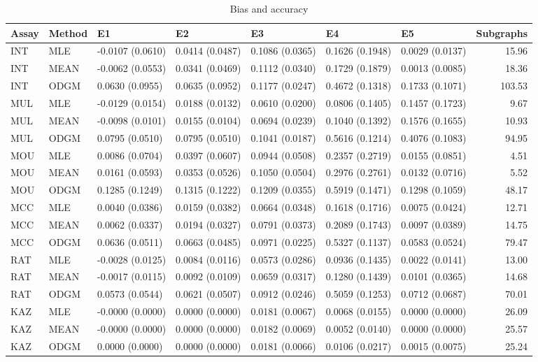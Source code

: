 \begin{table*}[t]
\begin{center}
  \begin{tabular}{lllllllr}
  \hline
 Assay & Method & E1 & E2 & E3 & E4 & E5 & Subgraphs \\ 
  \hline
  INT & MLE & -0.0107 (0.0610) & 0.0414 (0.0487) & 0.1086 (0.0365) & 0.1626 (0.1948) & 0.0029 (0.0137) & 15.96 \\ 
  INT & MEAN & -0.0062 (0.0553) & 0.0341 (0.0469) & 0.1112 (0.0340) & 0.1729 (0.1879) & 0.0013 (0.0085)& 18.36 \\ 
  INT & ODGM & 0.0630 (0.0955) & 0.0635 (0.0952) & 0.1177 (0.0247) & 0.4672 (0.1318) & 0.1733 (0.1071) & 103.53 \\ 
  MUL & MLE & -0.0129 (0.0154) & 0.0188 (0.0132) & 0.0610 (0.0200) & 0.0806 (0.1405) & 0.1457 (0.1723) & 9.67 \\ 
  MUL & MEAN & -0.0098 (0.0101) & 0.0155 (0.0104) & 0.0694 (0.0239) & 0.1040 (0.1392) & 0.1576 (0.1655)& 10.93 \\ 
  MUL & ODGM & 0.0795 (0.0510) & 0.0795 (0.0510) & 0.1041 (0.0187) & 0.5616 (0.1214) & 0.4076 (0.1083) & 94.95 \\ 
  MOU & MLE & 0.0086 (0.0704) & 0.0397 (0.0607) & 0.0944 (0.0508)  & 0.2357 (0.2719) & 0.0155 (0.0851) & 4.51 \\ 
  MOU & MEAN & 0.0161 (0.0593) & 0.0353 (0.0526) & 0.1050 (0.0504) & 0.2976 (0.2761) & 0.0132 (0.0716) & 5.52 \\ 
  MOU & ODGM & 0.1285 (0.1249) & 0.1315 (0.1222) & 0.1209 (0.0355) & 0.5919 (0.1471) & 0.1298 (0.1059) & 48.17 \\ 
  MCC & MLE & 0.0040 (0.0386) & 0.0159 (0.0382) & 0.0664 (0.0348)  & 0.1618 (0.1716) & 0.0075 (0.0424) & 12.71 \\ 
  MCC & MEAN & 0.0062 (0.0337) & 0.0194 (0.0327) & 0.0791 (0.0373) & 0.2089 (0.1743) & 0.0097 (0.0389) & 14.75 \\ 
  MCC & ODGM & 0.0636 (0.0511) & 0.0663 (0.0485) & 0.0971 (0.0225) & 0.5327 (0.1137) & 0.0583 (0.0524) & 79.47 \\ 
  RAT & MLE & -0.0028 (0.0125) & 0.0084 (0.0116) & 0.0573 (0.0286) & 0.0936 (0.1435) & 0.0022 (0.0141) & 13.00 \\ 
  RAT & MEAN & -0.0017 (0.0115) & 0.0092 (0.0109) & 0.0659 (0.0317) & 0.1280 (0.1439) & 0.0101 (0.0365)& 14.68 \\ 
  RAT & ODGM & 0.0573 (0.0544) & 0.0621 (0.0507) & 0.0912 (0.0246) & 0.5059 (0.1253) & 0.0712 (0.0687) & 70.01 \\ 
  KAZ & MLE & -0.0000 (0.0000) & 0.0000 (0.0000) & 0.0181 (0.0067) & 0.0068 (0.0155) & 0.0000 (0.0000) & 26.09 \\ 
  KAZ & MEAN & -0.0000 (0.0000) & 0.0000 (0.0000) & 0.0182 (0.0069) & 0.0052 (0.0140) & 0.0000 (0.0000)& 25.57 \\ 
  KAZ & ODGM & 0.0000 (0.0000) & 0.0000 (0.0000) & 0.0181 (0.0066) & 0.0106 (0.0217) & 0.0015 (0.0075) & 25.24 \\ 
   \hline
 \end{tabular}
\caption{Bias and accuracy}
\label{t:anal}
\end{center}
\end{table*}
